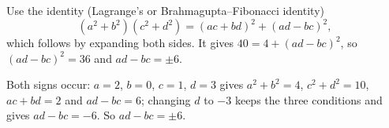 Use the identity (Lagrange's or Brahmagupta--Fibonacci identity)
\[
(a^2+b^2)(c^2+d^2)=(ac+bd)^2+(ad-bc)^2 ,
\]
which follows by expanding both sides. It gives $40=4+(ad-bc)^2$, so $(ad-bc)^2=36$ and $ad-bc=\pm6$.

Both signs occur: $a=2$, $b=0$, $c=1$, $d=3$ gives $a^2+b^2=4$, $c^2+d^2=10$, $ac+bd=2$ and $ad-bc=6$; changing $d$ to $-3$ keeps the three conditions and gives $ad-bc=-6$. So $ad-bc=\boxed{\pm6}$.
